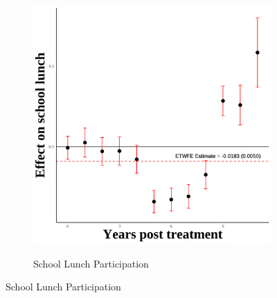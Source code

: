 \documentclass[12pt,english]{article}
\begin{document}
\begin{figure}[H]
\begin{subfigure}[b]{0.3\textwidth}
    \label{fig:ln-schl-lunch-third-two}
  \end{subfigure}
  \hfill
  \begin{subfigure}[b]{0.3\textwidth}
    \centering
    \caption{School Lunch Participation}
    \includegraphics[width=\linewidth]{figures/plot67-schl_lunch_event_study-third-two.png}
    \label{fig:schl-lunch-third-two}
  \end{subfigure}

  \vspace{0.3cm} %


\end{figure}
\end{document}
